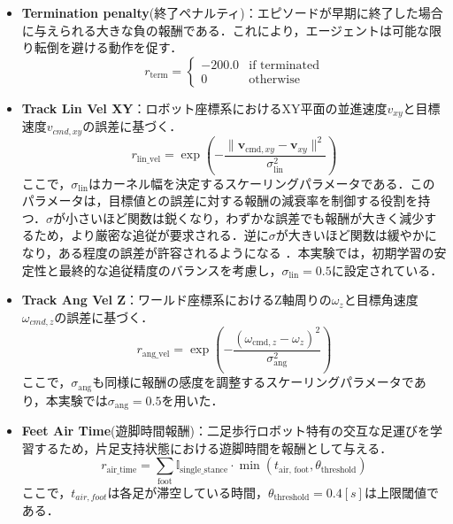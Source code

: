 \begin{itemize}
  \item \textbf{Termination penalty}(終了ペナルティ)：エピソードが早期に終了した場合に与えられる大きな負の報酬である．これにより，エージェントは可能な限り転倒を避ける動作を促す．
    \begin{equation}
      r_{\text{term}} = \begin{cases}
          -200.0 & \text{if terminated} \\
          0 & \text{otherwise}
      \end{cases}
    \end{equation}
  \item \textbf{Track Lin Vel XY}：ロボット座標系におけるXY平面の並進速度$v_{xy}$と目標速度$v_{cmd,xy}$の誤差に基づく．
    \begin{equation}
      r_{\text{lin\_vel}} = \exp \left( - \frac{\| \mathbf{v}_{\text{cmd}, xy} - \mathbf{v}_{xy} \|^2}{\sigma_{\text{lin}}^2} \right)
    \end{equation}
    ここで，$\sigma_{\text{lin}}$はカーネル幅を決定するスケーリングパラメータである．このパラメータは，目標値との誤差に対する報酬の減衰率を制御する役割を持つ．$\sigma$が小さいほど関数は鋭くなり，わずかな誤差でも報酬が大きく減少するため，より厳密な追従が要求される．逆に$\sigma$が大きいほど関数は緩やかになり，ある程度の誤差が許容されるようになる
    ．本実験では，初期学習の安定性と最終的な追従精度のバランスを考慮し，$\sigma_{\text{lin}} = 0.5$に設定されている．
  \item \textbf{Track Ang Vel Z}：ワールド座標系におけるZ軸周りの$\omega_{z}$と目標角速度$\omega_{cmd,z}$の誤差に基づく．
    \begin{equation}
      r_{\text{ang\_vel}} = \exp \left( - \frac{(\omega_{\text{cmd}, z} - \omega_z)^2}{\sigma_{\text{ang}}^2} \right)
    \end{equation}
    ここで，$\sigma_{\text{ang}}$も同様に報酬の感度を調整するスケーリングパラメータであり，本実験では$\sigma_{\text{ang}} = 0.5$を用いた．
  \item \textbf{Feet Air Time}(遊脚時間報酬)：二足歩行ロボット特有の交互な足運びを学習するため，片足支持状態における遊脚時間を報酬として与える．
    \begin{equation}
      r_{\text{air\_time}} = \sum_{\text{foot}} \mathbb{I}_{\text{single\_stance}} \cdot \min(t_{\text{air, foot}}, \theta_{\text{threshold}})
    \end{equation}
    ここで，$t_{air,foot}$は各足が滞空している時間，$\theta_{\text{threshold}} = 0.4[s]$は上限閾値である．

\end{itemize}
